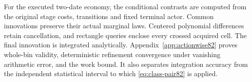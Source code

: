 For the executed two-date economy, the conditional contrasts are computed from the original stage costs, transitions and fixed terminal actor. Common innovations preserve their actual marginal laws. Centered polynomial differences retain cancellation, and rectangle queries enclose every crossed acquired cell. The final innovation is integrated analytically. Appendix~\ref{app:actionwise82} proves whole-bin validity, deterministic refinement convergence under vanishing arithmetic error, and the work bound. It also separates integration accuracy from the independent statistical interval to which \eqref{eq:class-pair82} is applied.
